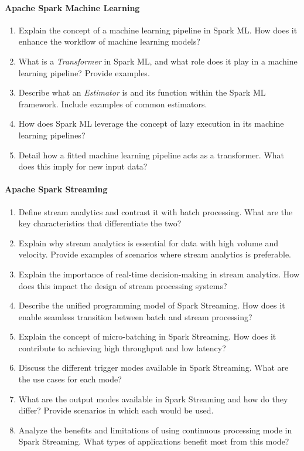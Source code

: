\begin{advanced}
\paragraph*{Apache Spark Machine Learning}
\begin{enumerate}
    \item Explain the concept of a machine learning pipeline in Spark ML. How does it enhance the workflow of machine learning models?
    \item What is a \emph{Transformer} in Spark ML, and what role does it play in a machine learning pipeline? Provide examples.
    \item Describe what an \emph{Estimator} is and its function within the Spark ML framework. Include examples of common estimators.
	\item How does Spark ML leverage the concept of lazy execution in its machine learning pipelines?
    \item Detail how a fitted machine learning pipeline acts as a transformer. What does this imply for new input data?
\end{enumerate}
\paragraph*{Apache Spark Streaming}
\begin{enumerate}
	\item Define stream analytics and contrast it with batch processing. What are the key characteristics that differentiate the two?
	\item Explain why stream analytics is essential for data with high volume and velocity. Provide examples of scenarios where stream analytics is preferable.
	\item Explain the importance of real-time decision-making in stream analytics. How does this impact the design of stream processing systems?
	\item Describe the unified programming model of Spark Streaming. How does it enable seamless transition between batch and stream processing?
	\item Explain the concept of micro-batching in Spark Streaming. How does it contribute to achieving high throughput and low latency?
	\item Discuss the different trigger modes available in Spark Streaming. What are the use cases for each mode?
	\item What are the output modes available in Spark Streaming and how do they differ? Provide scenarios in which each would be used.
	\item Analyze the benefits and limitations of using continuous processing mode in Spark Streaming. What types of applications benefit most from this mode?
\end{enumerate}
\end{advanced}
